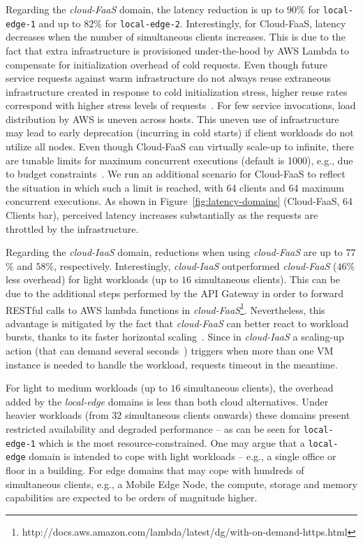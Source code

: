  Regarding the \textit{cloud-FaaS} domain, the latency reduction is up to $90$\% for \texttt{local-edge-1} and up to $82$\% for \texttt{local-edge-2}. Interestingly, for Cloud-FaaS, latency decreases when the number of simultaneous clients increases.
 This is due to the fact that extra infrastructure is provisioned under-the-hood by AWS Lambda to compensate for initialization overhead of cold requests. Even though future service requests against warm infrastructure do not always reuse extraneous infrastructure created in response to cold initialization stress, higher reuse rates correspond with higher stress levels of requests~\cite{Lloyd18serverless}. For few service invocations, load distribution by AWS is uneven across hosts. This uneven use of infrastructure may lead to early deprecation (incurring in cold starts) if client workloads do not utilize all nodes. 
 Even though Cloud-FaaS can virtually scale-up to infinite, there are tunable limits for maximum concurrent executions (default is 1000), e.g., due to budget constraints~\cite{Villamizar2017lambda}. We run an additional scenario for Cloud-FaaS to reflect the situation in which such a limit is reached, with 64 clients and 64 maximum concurrent executions. As shown in Figure~\ref{fig:latency-domains} (Cloud-FaaS, 64 Clients bar), perceived latency increases substantially as the requests are throttled by the infrastructure.
 
  Regarding the \textit{cloud-IaaS} domain, reductions when using \textit{cloud-FaaS} are up to $77$\% and $58$\%, respectively. Interestingly, \textit{cloud-IaaS} outperformed  \textit{cloud-FaaS} ($46$\% less overhead) for light workloads (up to $16$ simultaneous clients). This can be due to the additional steps performed by the API Gateway in order to forward RESTful calls to AWS lambda functions in \textit{cloud-FaaS}\footnote{http://docs.aws.amazon.com/lambda/latest/dg/with-on-demand-https.html}. Nevertheless, this advantage is mitigated by the fact that \textit{cloud-FaaS} can better react to workload bursts, thanks to its faster horizontal scaling~\cite{Villamizar2017lambda,Hendrickson:2016}. Since in \textit{cloud-IaaS} a scaling-up action (that can demand several seconds~\cite{Quatrocchi2016discrete}) triggers when more than one VM instance is needed to handle the workload, requests timeout in the meantime. 
 
 For light to medium workloads (up to $16$ simultaneous clients), the overhead added by the \textit{local-edge} domains is less than both cloud alternatives. Under heavier workloads (from $32$ simultaneous clients onwards) these domains present restricted availability and degraded performance -- as can be seen for \texttt{local-edge-1} which is the most resource-constrained. One may argue that a \texttt{local-edge} domain is intended to cope with light workloads -- e.g., a single office or floor in a building. For edge domains that may cope with hundreds of simultaneous clients, e.g., a Mobile Edge Node, the compute, storage and memory capabilities are expected to be orders of magnitude higher.
 
